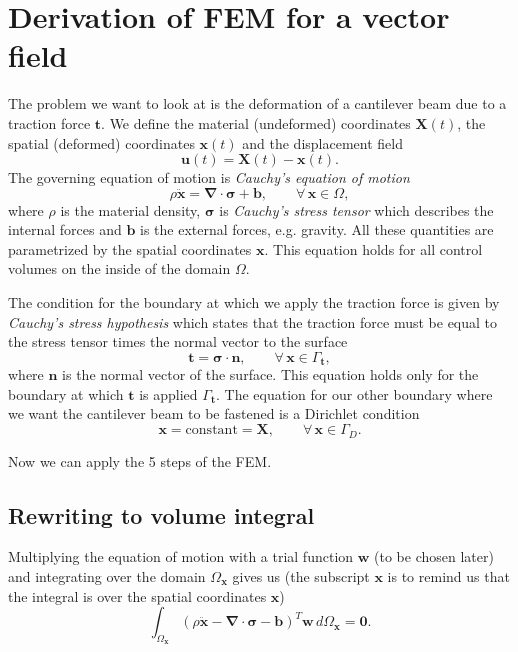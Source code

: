 \documentclass[acmtog]{acmart}
\begin{document}
\section{Derivation of FEM for a vector field}
The problem we want to look at is the deformation of a cantilever beam due to a traction force $\boldsymbol t$. We define the material (undeformed) coordinates $\boldsymbol X(t)$, the spatial (deformed) coordinates $\boldsymbol x(t)$ and the displacement field
%
\begin{equation}
  \boldsymbol u (t) = \boldsymbol X(t) - \boldsymbol x(t).
\end{equation}
%
The governing equation of motion is \textit{Cauchy's equation of motion}
%
\begin{equation}
  \rho \ddot{\boldsymbol x} = \boldsymbol \nabla \cdot \boldsymbol \sigma + \boldsymbol b, \qquad \forall \, \boldsymbol x \in \Omega,
\end{equation}
%
where $\rho$ is the material density, $\boldsymbol \sigma$ is \textit{Cauchy's stress tensor} which describes the internal forces and $\mathbf b$ is the external forces, e.g. gravity. All these quantities are parametrized by the spatial coordinates $\boldsymbol x$. This equation holds for all control volumes on the inside of the domain $\Omega$.

The condition for the boundary at which we apply the traction force is given by \textit{Cauchy's stress hypothesis} which states that the traction force must be equal to the stress tensor times the normal vector to the surface
%
\begin{equation}
  \boldsymbol t = \boldsymbol \sigma \cdot \boldsymbol n, \qquad \forall  \, \boldsymbol x  \in \Gamma_{\boldsymbol t},
\end{equation}
%
where $\boldsymbol n$ is the normal vector of the surface.
This equation holds only for the boundary at which $\boldsymbol t$ is applied $\Gamma_{\boldsymbol t}$.
The equation for our other boundary where we want the cantilever beam to be fastened is a Dirichlet condition
%
\begin{equation}
  \boldsymbol x = \mathrm{constant} = \boldsymbol X, \qquad \forall \,\boldsymbol x \in \Gamma_D.
\end{equation}
%

Now we can apply the 5 steps of the FEM.
%
\subsection{Rewriting to volume integral}
Multiplying the equation of motion with a trial function $\boldsymbol w$ (to be chosen later) and integrating over the domain $\Omega_{\boldsymbol x}$ gives us (the subscript $\boldsymbol x$ is to remind us that the integral is over the spatial coordinates $\boldsymbol x$)
%
\begin{equation}
  \int_{\Omega_{\boldsymbol x}} (\rho \ddot{\boldsymbol x} - \boldsymbol \nabla \cdot \boldsymbol \sigma - \boldsymbol b)^T \boldsymbol w \, d{\Omega_{\boldsymbol x}} = \boldsymbol 0.
\end{equation}
%
\end{document}
